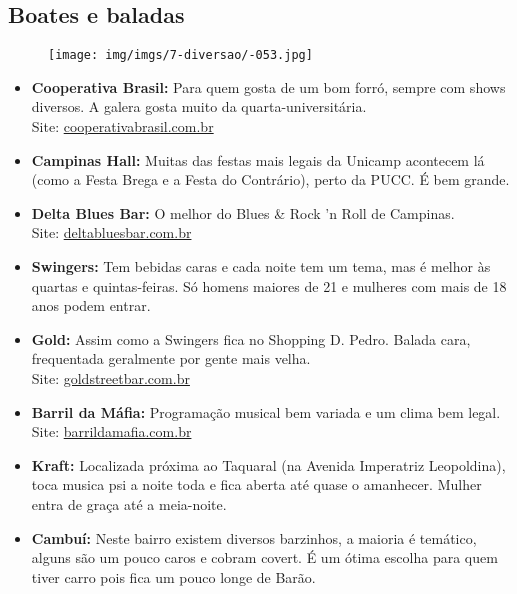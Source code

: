 \subsection{Boates e baladas}

\begin{figure}[hb!]
    \centering
    \texttt{[image: img/imgs/7-diversao/-053.jpg]}
\end{figure}

\begin{itemize}
\item   \textbf{Cooperativa Brasil:} Para quem gosta de um bom forró, sempre com
        shows diversos. A galera gosta muito da quarta-universitária.
        \\Site: \url{cooperativabrasil.com.br}

\item   \textbf{Campinas Hall:} Muitas das festas mais legais da Unicamp
        acontecem lá (como a Festa Brega e a Festa do Contrário), perto da PUCC.
        É bem grande.

\item   \textbf{Delta Blues Bar:} O melhor do Blues \& Rock 'n Roll de
        Campinas.
        \\Site: \url{deltabluesbar.com.br}

\item   \textbf{Swingers:} Tem bebidas caras e cada noite tem um tema, mas
        é melhor às quartas e quintas-feiras. Só homens maiores de 21 e mulheres
        com mais de 18 anos podem entrar.

\item   \textbf{Gold:} Assim como a Swingers fica no Shopping D. Pedro. Balada
        cara, frequentada geralmente por gente mais velha.
        \\Site: \url{goldstreetbar.com.br}

\item   \textbf{Barril da Máfia:} Programação musical bem variada e um clima
        bem legal.
        \\Site: \url{barrildamafia.com.br}

\item   \textbf{Kraft:} Localizada próxima ao Taquaral (na Avenida Imperatriz
        Leopoldina), toca musica psi a noite toda e fica aberta até quase
        o amanhecer. Mulher entra de graça até a meia-noite.

\item   \textbf{Cambuí:} Neste bairro existem diversos barzinhos, a maioria
        é temático, alguns são um pouco caros e cobram covert. É um ótima escolha
        para quem tiver carro pois fica um pouco longe de Barão.

\end{itemize}

